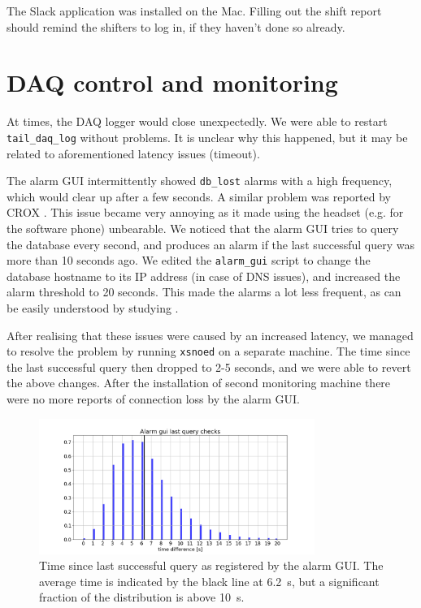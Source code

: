 \documentclass[a4paper,10pt]{article}
\begin{document}
The Slack application was installed on the Mac. Filling out the shift report should remind the shifters to log in, if they haven't done so already.


\section{DAQ control and monitoring}
At times, the DAQ logger would close unexpectedly. We were able to restart {\tt tail\_daq\_log} without problems. It is unclear why this happened, but it may be related to aforementioned latency issues (timeout).

The alarm GUI intermittently showed {\tt db\_lost} alarms with a high frequency, which would clear up after a few seconds. A similar problem was reported by CROX \cite{doc5051}. This issue became very annoying as it made using the headset (e.g. for the software phone) unbearable. We noticed that the alarm GUI tries to query the database every second, and produces an alarm if the last successful query was more than 10 seconds ago. We edited the {\tt alarm\_gui} script to change the database hostname to its IP address (in case of DNS issues), and increased the alarm threshold to 20 seconds. This made the alarms a lot less frequent, as can be easily understood by studying .

After realising that these issues were caused by an increased latency, we managed to resolve the problem by running {\tt xsnoed} on a separate machine. The time since the last successful query then dropped to 2-5 seconds, and we were able to revert the above changes. After the installation of second monitoring machine there were no more reports of connection loss by the alarm GUI.

\begin{figure}[htp]
	\centering
	\includegraphics[width=0.8\textwidth,trim={25mm 4mm 32mm 13mm},clip]{alarm_gui_checks}
	\caption{Time since last successful query as registered by the alarm GUI. The average time is indicated by the black line at 6.2~s, but a significant fraction of the distribution is above 10~s.}
	\label{alarm_gui}
\end{figure}
\end{document}
